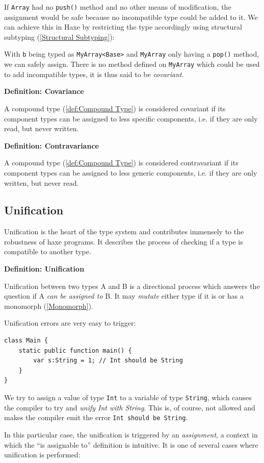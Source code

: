 \documentclass{article}
\newcommand{\type}[1]{\texttt{#1}}
\newcommand{\expr}[1]{\texttt{#1}}
\newenvironment{myshaded}
  {\def\FrameCommand{\fboxsep=\topsep\colorbox{bgcolor}}%
  \MakeFramed {\advance\hsize-\width \FrameRestore}}%
 {\endMakeFramed}
\newcommand{\define}[3][Definition]
	{\begin{myshaded}\noindent\textbf{#1: #2}\par\nobreak\noindent\ignorespaces#3\label{def:#2}\end{myshaded}}
\newcommand{\tref}[2]{#1 (\ref{#2})}
\begin{document}
If \type{Array} had no \expr{push()} method and no other means of modification, the assignment would be safe because no incompatible type could be added to it. We can achieve this in Haxe by restricting the type accordingly using \tref{structural subtyping}{Structural Subtyping}:



With \expr{b} being typed as \type{MyArray<Base>} and \type{MyArray} only having a \expr{pop()} method, we can safely assign. There is no method defined on \type{MyArray} which could be used to add incompatible types, it is thus said to be \emph{covariant}.

\define{Covariance}{A \tref{compound type}{def:Compound Type} is considered covariant if its component types can be assigned to less specific components, i.e. if they are only read, but never written.}

\define{Contravariance}{A \tref{compound type}{def:Compound Type} is considered contravariant if its component types can be assigned to less generic components, i.e. if they are only written, but never read.}




\subsection{Unification}
\label{Unification}

Unification is the heart of the type system and contributes immensely to the robustness of haxe programs. It describes the process of checking if a type is compatible to another type.

\define{Unification}{Unification between two types A and B is a directional process which answers the question if A \emph{can be assigned to} B. It may \emph{mutate} either type if it is or has a \tref{monomorph}{Monomorph}.}

Unification errors are very easy to trigger:

\begin{lstlisting}
class Main {
	static public function main() {
		var s:String = 1; // Int should be String
	}
}
\end{lstlisting}
We try to assign a value of type \type{Int} to a variable of type \type{String}, which causes the compiler to try and \emph{unify Int with String}. This is, of course, not allowed and makes the compiler emit the error \expr{Int should be String}.

In this particular case, the unification is triggered by an \emph{assignment}, a context in which the ``is assignable to'' definition is intuitive. It is one of several cases where unification is performed:
\end{document}
